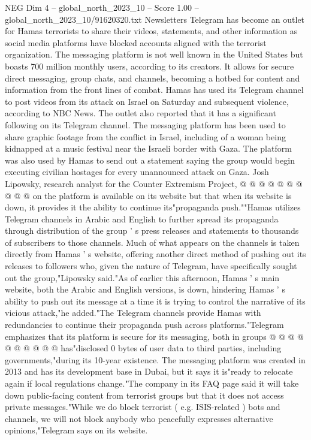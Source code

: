 \begin{textsample}{NEG Dim 4 – global\_north\_2023\_10 – Score 1.00 – global\_north\_2023\_10/91620320.txt}  \label{ex:f4_neg_005}
Newsletters Telegram has become an outlet for Hamas terrorists to share their videos, statements, and other information as social media platforms have blocked accounts aligned with the terrorist organization.
The messaging platform is not well known in the United States but boasts 700 million monthly users, according to its creators.
It allows for secure direct messaging, group chats, and channels, becoming a hotbed for content and information from the front lines of combat.
Hamas has used its Telegram channel to post videos from its attack on Israel on Saturday and subsequent violence, according to NBC News.
The outlet also reported that it has a significant following on its Telegram channel.
The messaging platform has been used to share graphic footage from the conflict in Israel, including of a woman being kidnapped at a music festival near the Israeli border with Gaza.
The platform was also used by Hamas to send out a statement saying the group would begin executing civilian hostages for every unannounced attack on Gaza.
Josh Lipowsky, research analyst for the Counter Extremism Project, @ @ @ @ @ @ @ @ @ @ on the platform is available on its website but that when its website is down, it provides it the ability to continue its"propaganda push.""Hamas utilizes Telegram channels in Arabic and English to further spread its propaganda through distribution of the group ' s press releases and statements to thousands of subscribers to those channels.
Much of what appears on the channels is taken directly from Hamas ' s website, offering another direct method of pushing out its releases to followers who, given the nature of Telegram, have specifically sought out the group,"Lipowsky said."As of earlier this afternoon, Hamas ' s main website, both the Arabic and English versions, is down, hindering Hamas ' s ability to push out its message at a time it is trying to control the narrative of its vicious attack,"he added."The Telegram channels provide Hamas with redundancies to continue their propaganda push across platforms."Telegram emphasizes that its platform is secure for its messaging, both in groups @ @ @ @ @ @ @ @ @ @ has"disclosed 0 bytes of user data to third parties, including governments,"during its 10-year existence.
The messaging platform was created in 2013 and has its development base in Dubai, but it says it is"ready to relocate again if local regulations change."The company in its FAQ page said it will take down public-facing content from terrorist groups but that it does not access private messages."While we do block terrorist ( e.g.
ISIS-related ) bots and channels, we will not block anybody who peacefully expresses alternative opinions,"Telegram says on its website.

\end{textsample}
